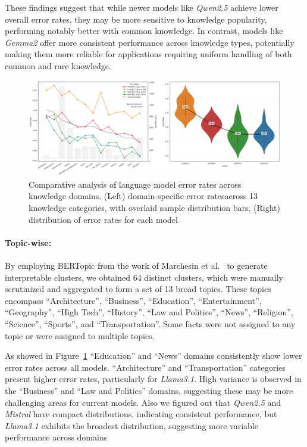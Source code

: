 These findings suggest that while newer models like \textit{Qwen2.5} achieve lower overall error rates, they may be more sensitive to knowledge popularity, performing notably better with common knowledge.
In contrast, models like \textit{Gemma2} offer more consistent performance across knowledge types, potentially making them more reliable for applications requiring uniform handling of both common and rare knowledge.

\begin{figure}[ht!]
    \centering
    \begin{minipage}[b]{\textwidth}
        \centering
        \includegraphics[width=\textwidth]{res/combined-model-analysis}
    \end{minipage}
    \caption{Comparative analysis of language model error rates across knowledge domains. (Left) domain-specific error ratesacross 13 knowledge categories, with overlaid sample distribution bars. (Right) distribution of error rates for each model}
    \label{fig:topic_distribution_analysis}
\end{figure}

\paragraph{Topic-wise:}
By employing BERTopic from the work of Marchesin et al.~\cite{Marchesin_Silvello_Alonso_2024} to generate interpretable clusters, we obtained 64 distinct clusters, which were manually scrutinized and aggregated to form a set of 13 broad topics.
These topics encompass ``Architecture'', ``Business'', ``Education'', ``Entertainment'', ``Geography'', ``High Tech'', ``History'', ``Law and Politics'', ``News'', ``Religion'', ``Science'', ``Sports'', and  ``Transportation''.
Some facts were not assigned to any topic or were assigned to multiple topics.

As showed in Figure~\ref{fig:topic_distribution_analysis} ``Education'' and ``News'' domains consistently show lower error rates across all models.
``Architecture'' and ``Transportation'' categories present higher error rates, particularly for \textit{Llama3.1}.
High variance is observed in the ``Business'' and ``Law and Politics'' domains, suggesting these may be more challenging areas for current models.
Also we figured out that \textit{Qwen2.5} and \textit{Mistral} have compact distributions, indicating consistent performance, but \textit{Llama3.1} exhibits the broadest distribution, suggesting more variable performance across domains

